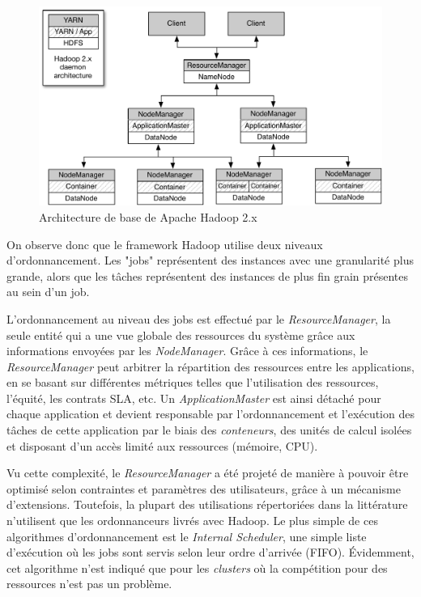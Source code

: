 \begin{figure}[!ht]
	\centering
	\includegraphics[width=0.85\linewidth]{img/HadoopArch.pdf}
	\caption{Architecture de base de Apache Hadoop 2.x}
	\label{fig:ArquiteturaHadoop}
\end{figure}


On observe donc que le framework Hadoop utilise deux niveaux d'ordonnancement. Les "jobs" représentent des instances avec une granularité plus grande, alors que les tâches représentent des instances de plus fin grain présentes au sein d'un job. 

L'ordonnancement au niveau des jobs est effectué par le \textit{ResourceManager}, la seule entité qui a une vue globale des ressources du système grâce aux informations envoyées par les \textit{NodeManager}. Grâce à ces informations, le \textit{ResourceManager} peut arbitrer la répartition des ressources entre les applications, en se basant sur différentes métriques telles que l'utilisation des ressources, l'équité, les contrats SLA, etc. Un \textit{ApplicationMaster} est ainsi détaché pour chaque application et devient responsable par l'ordonnancement et l'exécution des tâches de cette application par le biais des \textit{conteneurs}, des unités de calcul isolées et disposant d'un accès limité aux ressources (mémoire, CPU). 

Vu cette complexité, le \textit{ResourceManager} a été projeté de manière à pouvoir être optimisé selon contraintes et paramètres des utilisateurs, grâce à un mécanisme d'extensions. Toutefois, la plupart des utilisations répertoriées dans la littérature n'utilisent que les ordonnanceurs livrés avec Hadoop. Le plus simple de ces algorithmes d'ordonnancement est le \textit{Internal Scheduler}, une simple liste d'exécution où les jobs sont servis selon leur ordre d'arrivée (FIFO). Évidemment, cet algorithme n'est indiqué que pour les \textit{clusters} où la compétition pour des ressources n'est pas un problème. 

